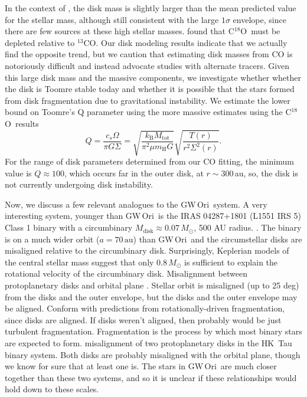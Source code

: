 \documentclass[twocolumn]{aastex61}
\newcommand{\obj}{GW\,Ori}
\newcommand{\thirteen}{${}^{13}$CO}
\newcommand{\eighteen}{C${}^{18}$O}
\begin{document}
In the context of \citet{andrews13}, the disk mass is slightly larger than the mean predicted value for the stellar mass, although still consistent with the large $1\sigma$ envelope, since there are few sources at these high stellar masses. \citet{fang17} found that \eighteen\ must be depleted relative to \thirteen. Our disk modeling results indicate that we actually find the opposite trend, but we caution that estimating disk masses from CO is notoriously difficult \citep{yu17} and instead advocate studies with alternate tracers.
Given this large disk mass and the massive components, we investigate whether whether the disk is Toomre stable today and whether it is possible that the stars formed from disk fragmentation due to gravitational instability. We estimate the lower bound on Toomre's Q parameter using the more massive estimates using the \eighteen\ results
\begin{equation}
Q = \frac{c_s \Omega}{\pi G \Sigma} = \sqrt{\frac{k_\mathrm{B} M_\mathrm{tot}}{\pi^2 \mu m_\mathrm{H} G}} \sqrt{\frac{T(r)}{r^2 \Sigma^2(r)}}.
\end{equation}
For the range of disk parameters determined from our CO fitting, the minimum value is $Q \approx 100$, which occurs far in the outer disk, at $r \sim 300\,$au, so, the disk is not currently undergoing disk instability.

Now, we discuss a few relevant analogues to the \obj\ system.
A very interesting system, younger than \obj\ is the IRAS 04287+1801 (L1551 IRS 5) Class 1 binary with a circumbinary $M_\mathrm{disk} \approx 0.07 \,M_\odot$, 500 AU radius. \citep{eisner12,takakuwa17}. The binary is on a much wider orbit ($a = 70\,\mathrm{au}$) than \obj\, and the circumstellar disks are misaligned relative to the circumbinary disk.
Surprisingly, Keplerian models of the central stellar mass suggest that only $0.8\,M_\odot$ is sufficient to explain the rotational velocity of the circumbinary disk. Misalignment between protoplanetary disks and orbital plane \citep{lim16}. Stellar orbit is misaligned (up to 25 deg) from the disks and the outer envelope, but the disks and the outer envelope may be aligned. Conform with predictions from rotationally-driven fragmentation, since disks are aligned. If disks weren't aligned, then probably would be just turbulent fragmentation. Fragmentation is the process by which most binary stars are expected to form. \citet{jensen14} misalignment of two protoplanetary disks in the HK~Tau binary system. Both disks are probably misaligned with the orbital plane, though we know for sure that at least one is.
The stars in \obj\ are much closer together than these two systems, and so it is unclear if these relationships would hold down to these scales.
\end{document}
